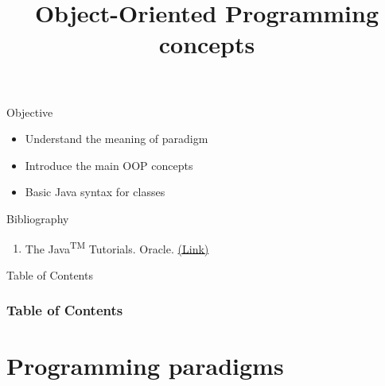 \documentclass[10pt,compress]{beamer} %
\title[OOP concepts]{Object-Oriented Programming concepts}
\author{}
\institute{\asignatura}
\date{}
\begin{document}
{\titlepageBlue
    \begin{frame}
        \titlepage
    \end{frame}
}

\begin{frame}[plain]{}
   \begin{block}{Objective}
   \begin{itemize}
   		\item Understand the meaning of paradigm
   		\item Introduce the main OOP concepts
		\item Basic Java syntax for classes
	\end{itemize}
	\end{block}

   \begin{block}{Bibliography}
      \begin{enumerate}
          \item The Java\textsuperscript{TM} Tutorials. Oracle. \href{https://docs.oracle.com/javase/tutorial/}{(Link)}
      \end{enumerate} 
   \end{block}
\end{frame}

{
\eliminarNavegacion
\begin{frame}[shrink]{Table of Contents}
 \frametitle{Table of Contents}
 \tableofcontents
\end{frame}
}

\section[Programming paradigms]{Programming paradigms}

\end{document}
